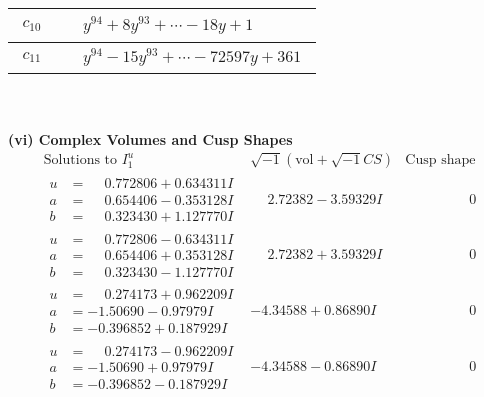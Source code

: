 \documentclass[1p]{elsarticle_modified}
\theoremstyle{definition}
\newcommand{\I}{\sqrt{-1}}
\begin{document}
\begin{tabular}{m{50pt}|m{274pt}}
\hline $$\begin{aligned}c_{10}\end{aligned}$$&$\begin{aligned}
&y^{94}+8 y^{93}+\cdots-18 y+1
\end{aligned}$\\
\hline $$\begin{aligned}c_{11}\end{aligned}$$&$\begin{aligned}
&y^{94}-15 y^{93}+\cdots-72597 y+361
\end{aligned}$\\
\hline
\end{tabular}\\~\\
\newpage\flushleft \textbf{(vi) Complex Volumes and Cusp Shapes}
$$\begin{array}{c|c|c}  
\text{Solutions to }I^u_{1}& \I (\text{vol} + \sqrt{-1}CS) & \text{Cusp shape}\\
 \hline 
\begin{aligned}
u &= \phantom{-}0.772806 + 0.634311 I \\
a &= \phantom{-}0.654406 - 0.353128 I \\
b &= \phantom{-}0.323430 + 1.127770 I\end{aligned}
 & \phantom{-}2.72382 - 3.59329 I & \phantom{-0.000000 } 0 \\ \hline\begin{aligned}
u &= \phantom{-}0.772806 - 0.634311 I \\
a &= \phantom{-}0.654406 + 0.353128 I \\
b &= \phantom{-}0.323430 - 1.127770 I\end{aligned}
 & \phantom{-}2.72382 + 3.59329 I & \phantom{-0.000000 } 0 \\ \hline\begin{aligned}
u &= \phantom{-}0.274173 + 0.962209 I \\
a &= -1.50690 - 0.97979 I \\
b &= -0.396852 + 0.187929 I\end{aligned}
 & -4.34588 + 0.86890 I & \phantom{-0.000000 } 0 \\ \hline\begin{aligned}
u &= \phantom{-}0.274173 - 0.962209 I \\
a &= -1.50690 + 0.97979 I \\
b &= -0.396852 - 0.187929 I\end{aligned}
 & -4.34588 - 0.86890 I & \phantom{-0.000000 } 0 \\ \hline\begin{aligned}

\end{aligned}
\end{array}$$
\end{document}
